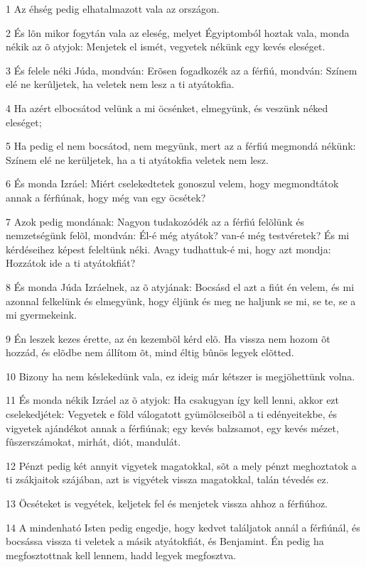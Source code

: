 \par 1 Az éhség pedig elhatalmazott vala az országon.
\par 2 És lõn mikor fogytán vala az eleség, melyet Égyiptomból hoztak vala, monda nékik az õ atyjok: Menjetek el ismét, vegyetek nékünk egy kevés eleséget.
\par 3 És felele néki Júda, mondván: Erõsen fogadkozék az a férfiú, mondván: Színem elé ne kerûljetek, ha veletek nem lesz a ti atyátokfia.
\par 4 Ha azért elbocsátod velünk a mi öcsénket, elmegyünk, és veszünk néked eleséget;
\par 5 Ha pedig el nem bocsátod, nem megyünk, mert az a férfiú megmondá nékünk: Színem elé ne kerüljetek, ha a ti atyátokfia veletek nem lesz.
\par 6 És monda Izráel: Miért cselekedtetek gonoszul velem, hogy megmondtátok annak a férfiúnak, hogy még van egy öcsétek?
\par 7 Azok pedig mondának: Nagyon tudakozódék az a férfiú felõlünk és nemzetségünk felõl, mondván: Él-é még atyátok? van-é még testvéretek? És mi kérdéseihez képest feleltünk néki. Avagy tudhattuk-é mi, hogy azt mondja: Hozzátok ide a ti atyátokfiát?
\par 8 És monda Júda Izráelnek, az õ atyjának: Bocsásd el azt a fiút én velem, és mi azonnal felkelünk és elmegyünk, hogy éljünk és meg ne haljunk se mi, se te, se a mi gyermekeink.
\par 9 Én leszek kezes érette, az én kezembõl kérd elõ. Ha vissza nem hozom õt hozzád, és elõdbe nem állítom õt, mind éltig bûnös legyek elõtted.
\par 10 Bizony ha nem késlekedünk vala, ez ideig már kétszer is megjöhettünk volna.
\par 11 És monda nékik Izráel az õ atyjok: Ha csakugyan így kell lenni, akkor ezt cselekedjétek: Vegyetek e föld válogatott gyümölcseibõl a ti edényeitekbe, és vigyetek ajándékot annak a férfiúnak; egy kevés balzsamot, egy kevés mézet, fûszerszámokat, mirhát, diót, mandulát.
\par 12 Pénzt pedig két annyit vigyetek magatokkal, sõt a mely pénzt meghoztatok a ti zsákjaitok szájában, azt is vigyétek vissza magatokkal, talán tévedés ez.
\par 13 Öcséteket is vegyétek, keljetek fel és menjetek vissza ahhoz a férfiúhoz.
\par 14 A mindenható Isten pedig engedje, hogy kedvet találjatok annál a férfiúnál, és bocsássa vissza ti veletek a másik atyátokfiát, és Benjamint. Én pedig ha megfosztottnak kell lennem, hadd legyek megfosztva.
